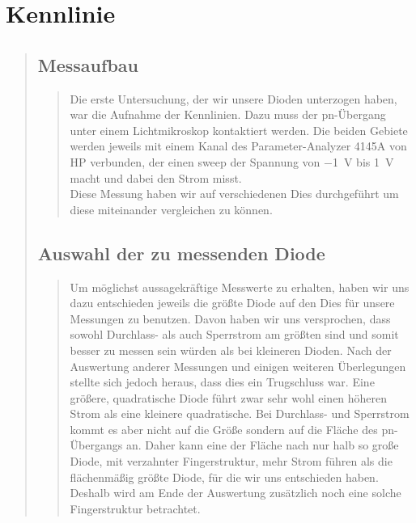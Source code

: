 \section{Kennlinie}
\begin{quote}
    \subsection{Messaufbau}
    \begin{quote}
        Die erste Untersuchung, der wir unsere Dioden unterzogen haben, war die Aufnahme der Kennlinien. Dazu muss der
        pn-Übergang unter einem Lichtmikroskop kontaktiert werden. Die beiden Gebiete werden jeweils mit einem Kanal des
        Parameter-Analyzer 4145A von HP verbunden, der einen sweep der Spannung von \SI{-1}{\volt} bis \SI{1}{\volt} macht
        und dabei den Strom misst.\\
        Diese Messung haben wir auf verschiedenen Dies durchgeführt um diese miteinander vergleichen zu können.

    \end{quote} %


    \subsection{Auswahl der zu messenden Diode}
    \begin{quote}
        Um möglichst aussagekräftige Messwerte zu erhalten, haben wir uns dazu entschieden jeweils die größte Diode auf
        den Dies für unsere Messungen zu benutzen. Davon haben wir uns versprochen, dass sowohl Durchlass- als
        auch Sperrstrom am größten sind und somit besser zu messen sein würden als bei kleineren Dioden.
        Nach der Auswertung anderer Messungen und einigen weiteren Überlegungen stellte sich jedoch heraus, dass
        dies ein Trugschluss war. Eine größere, quadratische Diode führt zwar sehr wohl einen höheren Strom als eine
        kleinere quadratische. Bei Durchlass- und Sperrstrom kommt es aber nicht auf die Größe sondern auf die
        Fläche des pn-Übergangs an. Daher kann eine der Fläche nach nur halb so große Diode, mit verzahnter
        Fingerstruktur, mehr Strom führen als die flächenmäßig größte Diode, für die wir uns entschieden haben. Deshalb
        wird am Ende der Auswertung zusätzlich noch eine solche Fingerstruktur betrachtet.

    \end{quote} %



\end{quote}

